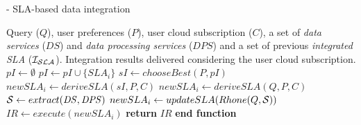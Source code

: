 \begin{algorithm} 
\caption{ - SLA-based data integration}
\label{qualityBasedAlgorithm}
\begin{algorithmic}[1]
\REQUIRE Query ($Q$), user preferences ($P$), user cloud subscription ($C$), a set of \textit{data services} ($\mathit{DS}$) and \textit{data processing services} ($\mathit{DPS}$) and a set of previous \textit{integrated SLA} ($\bigSLA$).
\ENSURE Integration results delivered considering the user cloud subscription.
\STATE $pI \leftarrow \emptyset$
		\STATE $pI \leftarrow pI \cup \lbrace SLA_{i} \rbrace$		
	\ENDIF
\ENDFOR
{}
	\STATE $sI \leftarrow chooseBest(P, pI)$
	\STATE $newSLA_{i} \leftarrow deriveSLA(sI, P, C)$
\ELSE
	\STATE $newSLA_{i} \leftarrow deriveSLA(Q, P, C)$
	\STATE $\bigS \leftarrow extract(\mathit{DS}, \mathit{DPS})$
	\STATE $newSLA_{i} \leftarrow updateSLA(Rhone(Q, \bigS))$
\ENDIF
\STATE $IR \leftarrow execute(newSLA_{i})$
\STATE \textbf{return} $IR$
\STATE \textbf{end function}
\end{algorithmic}
\end{algorithm} 

